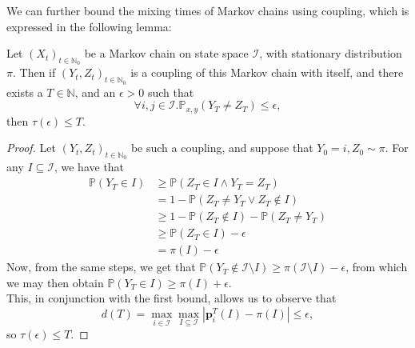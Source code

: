 		We can further bound the mixing times of Markov chains using coupling, which
		is expressed in  the following lemma:
		\begin{lemma}
			Let $(X_t)_{t\in\mathbb{N}_0}$ be a Markov chain on state space $\mathcal
			{I}$, with stationary distribution $\pi$. Then if $(Y_t,Z_t)_{t\in
			\mathbb{N}_0}$ is a coupling of this Markov
			chain with itself, and there exists a $T\in\mathbb{N}$, and an $\epsilon>0$
			such that
			$$
				\forall i,j \in \mathcal{I}.
				\mathbb{P}_{x,y}(Y_T \neq Z_T) \leq \epsilon,
			$$
			then $\tau(\epsilon) \leq T$.
		\end{lemma}
		\begin{proof}
			Let $(Y_t, Z_t)_{t\in\mathbb{N}_0}$ be such a coupling, and suppose that
			$Y_0 = i, Z_0 \sim \pi$. For any $I \subseteq \mathcal{I}$, we have that
			\begin{align*}
				\mathbb{P}(Y_T \in I) &\geq \mathbb{P}(Z_T \in I \land Y_T=Z_T) \\
				&= 1 - \mathbb{P}(Z_T \neq Y_T \lor Z_T \notin I) \\
				&\geq 1 - \mathbb{P}(Z_T\notin I) - \mathbb{P}(Z_T \neq Y_T) \\
				&\geq \mathbb{P}(Z_T \in I) - \epsilon \\
				&= \pi(I) - \epsilon
			\end{align*}
			Now, from the same steps, we get that $\mathbb{P}(Y_T\notin\mathcal{I}
			\setminus I) \geq \pi(\mathcal{I}  \setminus I) - \epsilon$, from which we 
			may then obtain $\mathbb{P}(Y_T \in I) \geq \pi(I) + \epsilon$.\\
			This, in conjunction with the first bound, allows us to observe that
			$$
				d(T) = \max_{i\in \mathcal{I}}\max_{I\subseteq\mathcal{I}} 
				|\mathbf{p}^T_i(I)-\pi(I)| \leq \epsilon,
			$$ 
			so $\tau(\epsilon) \leq T$.
		\end{proof}
